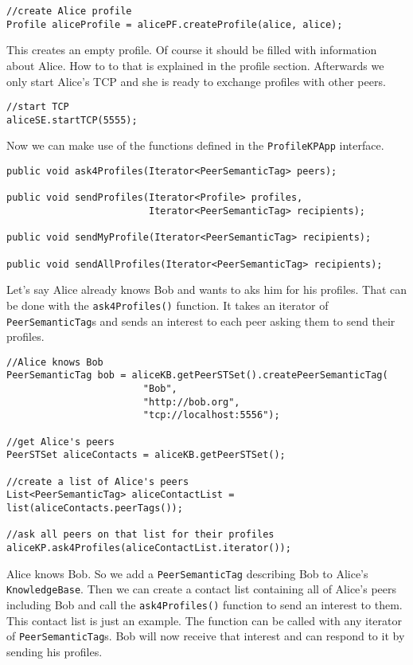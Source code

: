 \begin{verbatim}
//create Alice profile
Profile aliceProfile = alicePF.createProfile(alice, alice);
\end{verbatim}

This creates an empty profile. Of course it should be filled with information about Alice. How to to that is explained in the profile section. 
Afterwards we only start Alice's TCP and she is ready to exchange profiles with other peers.

\begin{verbatim}
//start TCP
aliceSE.startTCP(5555);
\end{verbatim}

Now we can make use of the functions defined in the {\tt ProfileKPApp} interface.

\begin{verbatim}
public void ask4Profiles(Iterator<PeerSemanticTag> peers);

public void sendProfiles(Iterator<Profile> profiles, 
						 Iterator<PeerSemanticTag> recipients);

public void sendMyProfile(Iterator<PeerSemanticTag> recipients);

public void sendAllProfiles(Iterator<PeerSemanticTag> recipients);
\end{verbatim}

Let's say Alice already knows Bob and wants to aks him for his profiles. That can be done with the {\tt ask4Profiles()} function. It takes an iterator of {\tt PeerSemanticTag}s and sends an interest to each peer asking them to send their profiles.

\begin{verbatim}
//Alice knows Bob
PeerSemanticTag bob = aliceKB.getPeerSTSet().createPeerSemanticTag(
						"Bob", 
						"http://bob.org", 
						"tcp://localhost:5556");

//get Alice's peers
PeerSTSet aliceContacts = aliceKB.getPeerSTSet();

//create a list of Alice's peers
List<PeerSemanticTag> aliceContactList = list(aliceContacts.peerTags());

//ask all peers on that list for their profiles
aliceKP.ask4Profiles(aliceContactList.iterator());
\end{verbatim}

Alice knows Bob. So we add a {\tt PeerSemanticTag} describing Bob to Alice's {\tt KnowledgeBase}. Then we can create a contact list containing all of Alice's peers including Bob and call the {\tt ask4Profiles()} function to send an interest to them. This contact list is just an example. The function can be called with any iterator of {\tt PeerSemanticTag}s. Bob will now receive that interest and can respond to it by sending his profiles.

